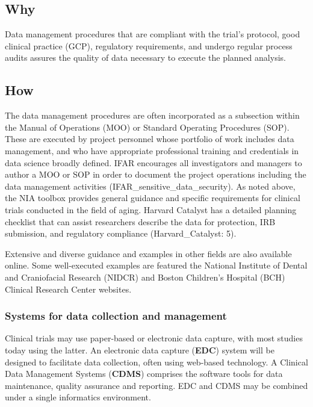 \documentclass[]{book}
\begin{document}
\subsection{Why}\label{why-18}

Data management procedures that are compliant with the trial's protocol,
good clinical practice (GCP), regulatory requirements, and undergo
regular process audits assures the quality of data necessary to execute
the planned analysis.

\subsection{How}\label{how-18}

The data management procedures are often incorporated as a subsection
within the Manual of Operations (MOO) or Standard Operating Procedures
(SOP). These are executed by project personnel whose portfolio of work
includes data management, and who have appropriate professional training
and credentials in data science broadly defined. IFAR encourages all
investigators and managers to author a MOO or SOP in order to document
the project operations including the data management activities
(IFAR\_sensitive\_data\_security). As noted above, the NIA toolbox
provides general guidance and specific requirements for clinical trials
conducted in the field of aging. Harvard Catalyst has a detailed
planning checklist that can assist researchers describe the data for
protection, IRB submission, and regulatory compliance
(Harvard\_Catalyst: 5).

Extensive and diverse guidance and examples in other fields are also
available online. Some well-executed examples are featured the National
Institute of Dental and Craniofacial Research (NIDCR) and Boston
Children's Hospital (BCH) Clinical Research Center websites.

\subsubsection{Systems for data collection and
management}\label{systems-for-data-collection-and-management}

Clinical trials may use paper-based or electronic data capture, with
most studies today using the latter. An electronic data capture
(\textbf{EDC}) system will be designed to facilitate data collection,
often using web-based technology. A Clinical Data Management Systems
(\textbf{CDMS}) comprises the software tools for data maintenance,
quality assurance and reporting. EDC and CDMS may be combined under a
single informatics environment.
\end{document}
